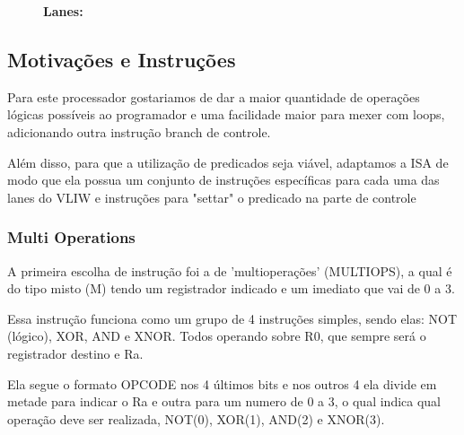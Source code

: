 \documentclass{article}
\begin{document}
    \begin{figure}[H]
        \captionsetup{labelformat=empty, skip=0pt}
        \caption{\textbf{Lanes:}}
        \centering 
    \end{figure}

    \subsection{Motivações e Instruções}

    Para este processador gostariamos de dar a maior quantidade de operações lógicas possíveis ao programador e uma facilidade maior para mexer com loops, adicionando outra instrução branch de controle.
    
    Além disso, para que a utilização de predicados seja viável, adaptamos a ISA de modo que ela possua um conjunto de instruções específicas para cada uma das lanes do VLIW e instruções para "settar" o predicado na parte de controle

    \subsubsection{Multi Operations}

    A primeira escolha de instrução foi a de 'multioperações' (MULTIOPS), a qual é do tipo misto (M) tendo um
    registrador indicado e um imediato que vai de 0 a 3.

    Essa instrução funciona como um grupo de 4 instruções simples, sendo elas: NOT (lógico), XOR, AND e XNOR. Todos
    operando sobre R0, que sempre será o registrador destino e Ra.

    Ela segue o formato OPCODE nos 4 últimos bits e nos outros 4 ela divide em metade para indicar o
    Ra e outra para um numero de 0 a 3, o qual indica qual operação deve ser realizada, NOT(0), XOR(1),
    AND(2) e XNOR(3).
\end{document}
